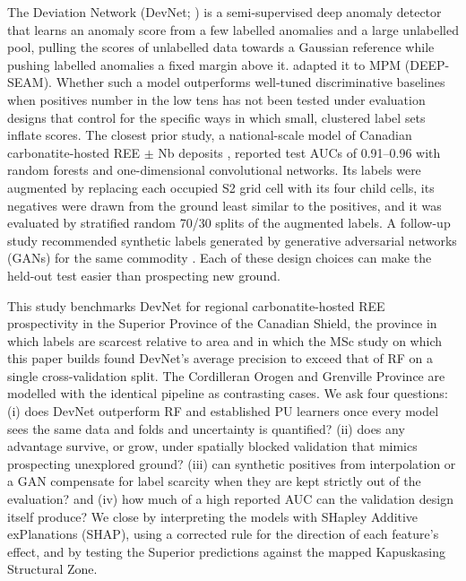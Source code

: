 \documentclass[pdflatex,sn-apa]{sn-jnl}
\begin{document}
The Deviation Network (DevNet; \citealp{Pang2019}) is a semi-supervised deep anomaly detector that learns an anomaly score from a few labelled anomalies and a large unlabelled pool, pulling the scores of unlabelled data towards a Gaussian reference while pushing labelled anomalies a fixed margin above it. \citet{Luo2026} adapted it to MPM (DEEP-SEAM). Whether such a model outperforms well-tuned discriminative baselines when positives number in the low tens has not been tested under evaluation designs that control for the specific ways in which small, clustered label sets inflate scores. The closest prior study, a national-scale model of Canadian carbonatite-hosted REE $\pm$ Nb deposits \citep{Parsa2024}, reported test AUCs of 0.91--0.96 with random forests and one-dimensional convolutional networks. Its labels were augmented by replacing each occupied S2 grid cell with its four child cells, its negatives were drawn from the ground least similar to the positives, and it was evaluated by stratified random 70/30 splits of the augmented labels. A follow-up study recommended synthetic labels generated by generative adversarial networks (GANs) for the same commodity \citep{Parsa2025}. Each of these design choices can make the held-out test easier than prospecting new ground.

This study benchmarks DevNet for regional carbonatite-hosted REE prospectivity in the Superior Province of the Canadian Shield, the province in which labels are scarcest relative to area and in which the MSc study on which this paper builds found DevNet's average precision to exceed that of RF on a single cross-validation split. The Cordilleran Orogen and Grenville Province are modelled with the identical pipeline as contrasting cases. We ask four questions: (i) does DevNet outperform RF and established PU learners once every model sees the same data and folds and uncertainty is quantified? (ii) does any advantage survive, or grow, under spatially blocked validation that mimics prospecting unexplored ground? (iii) can synthetic positives from interpolation or a GAN compensate for label scarcity when they are kept strictly out of the evaluation? and (iv) how much of a high reported AUC can the validation design itself produce? We close by interpreting the models with SHapley Additive exPlanations (SHAP), using a corrected rule for the direction of each feature's effect, and by testing the Superior predictions against the mapped Kapuskasing Structural Zone.

\end{document}
